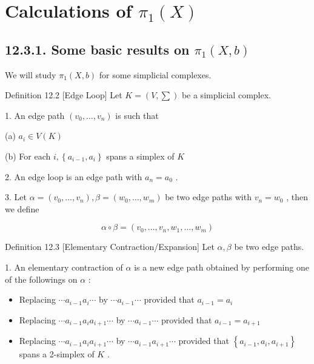 \chapter{Calculations of $\pi_1(X)$}

\section*{12.3.1. Some basic results on \({\pi }_{1}\left( {X,b}\right)\)}

We will study \({\pi }_{1}\left( {X,b}\right)\) for some simplicial complexes.

Definition 12.2 [Edge Loop] Let \(K = \left( {V,\sum }\right)\) be a simplicial complex.

1. An edge path \(\left( {{v}_{0},\ldots ,{v}_{n}}\right)\) is such that

(a) \({a}_{i} \in  V\left( K\right)\)

(b) For each \(i,\left\{  {{a}_{i - 1},{a}_{i}}\right\}\) spans a simplex of \(K\)

2. An edge loop is an edge path with \({a}_{n} = {a}_{0}\) .

3. Let \(\alpha  = \left( {{v}_{0},\ldots ,{v}_{n}}\right) ,\beta  = \left( {{w}_{0},\ldots ,{w}_{m}}\right)\) be two edge paths with \({v}_{n} = {w}_{0}\) , then we define

\[
\alpha  \circ  \beta  = \left( {{v}_{0},\ldots ,{v}_{n},{w}_{1},\ldots ,{w}_{m}}\right)
\]

Definition 12.3 [Elementary Contraction/Expansion] Let \(\alpha ,\beta\) be two edge paths.

1. An elementary contraction of \(\alpha\) is a new edge path obtained by performing one of the followings on \(\alpha\) :

\begin{itemize}
\item Replacing \(\cdots {a}_{i - 1}{a}_{i}\cdots\) by \(\cdots {a}_{i - 1}\cdots\) provided that \({a}_{i - 1} = {a}_{i}\)
\end{itemize}

\begin{itemize}
\item Replacing \(\cdots {a}_{i - 1}{a}_{i}{a}_{i + 1}\cdots\) by \(\cdots {a}_{i - 1}\cdots\) provided that \({a}_{i - 1} = {a}_{i + 1}\)
\end{itemize}

\begin{itemize}
\item Replacing \(\cdots {a}_{i - 1}{a}_{i}{a}_{i + 1}\cdots\) by \(\cdots {a}_{i - 1}{a}_{i + 1}\cdots\) provided that \(\left\{  {{a}_{i - 1},{a}_{i},{a}_{i + 1}}\right\}\) spans a 2-simplex of \(K\) .
\end{itemize}

